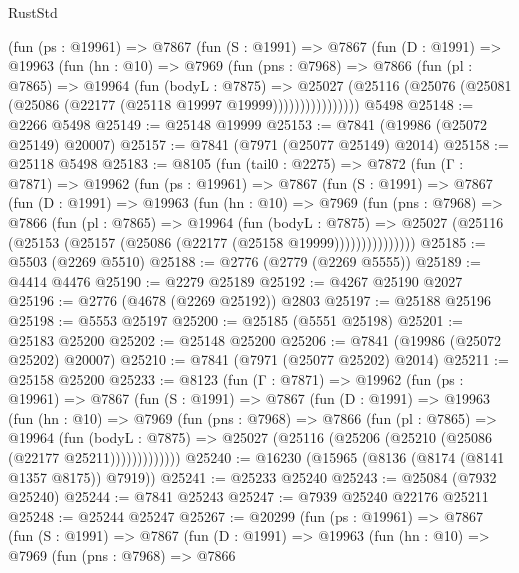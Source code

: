 \begin{lexlean}{RustStd}
\begin{coremodule}
          (fun (ps : @19961) =>
          @7867
            (fun (S : @1991) =>
            @7867
              (fun (D : @1991) =>
              @19963
                (fun (hn : @10) =>
                @7969
                  (fun (pns : @7968) =>
                  @7866
                    (fun (pl : @7865) =>
                    @19964
                      (fun (bodyL : @7875) =>
                      @25027
                        (@25116
                          (@25076 (@25081 (@25086 (@22177 (@25118 @19997 @19999))))))))))))))))
    @5498
@25148 := @2266 @5498
@25149 := @25148 @19999
@25153 := @7841 (@19986 (@25072 @25149) @20007)
@25157 := @7841 (@7971 (@25077 @25149) @2014)
@25158 := @25118 @5498
@25183 := @8105
    (fun (tail0 : @2275) =>
    @7872
      (fun (Γ : @7871) =>
      @19962
        (fun (ps : @19961) =>
        @7867
          (fun (S : @1991) =>
          @7867
            (fun (D : @1991) =>
            @19963
              (fun (hn : @10) =>
              @7969
                (fun (pns : @7968) =>
                @7866
                  (fun (pl : @7865) =>
                  @19964
                    (fun (bodyL : @7875) =>
                    @25027 (@25116 (@25153 (@25157 (@25086 (@22177 (@25158 @19999)))))))))))))))
@25185 := @5503 (@2269 @5510)
@25188 := @2776 (@2779 (@2269 @5555))
@25189 := @4414 @4476
@25190 := @2279 @25189
@25192 := @4267 @25190 @2027
@25196 := @2776 (@4678 (@2269 @25192)) @2803
@25197 := @25188 @25196
@25198 := @5553 @25197
@25200 := @25185 (@5551 @25198)
@25201 := @25183 @25200
@25202 := @25148 @25200
@25206 := @7841 (@19986 (@25072 @25202) @20007)
@25210 := @7841 (@7971 (@25077 @25202) @2014)
@25211 := @25158 @25200
@25233 := @8123
    (fun (Γ : @7871) =>
    @19962
      (fun (ps : @19961) =>
      @7867
        (fun (S : @1991) =>
        @7867
          (fun (D : @1991) =>
          @19963
            (fun (hn : @10) =>
            @7969
              (fun (pns : @7968) =>
              @7866
                (fun (pl : @7865) =>
                @19964
                  (fun (bodyL : @7875) =>
                  @25027 (@25116 (@25206 (@25210 (@25086 (@22177 @25211)))))))))))))
@25240 := @16230 (@15965 (@8136 (@8174 (@8141 @1357 @8175)) @7919))
@25241 := @25233 @25240
@25243 := @25084 (@7932 @25240)
@25244 := @7841 @25243
@25247 := @7939 @25240 @22176 @25211
@25248 := @25244 @25247
@25267 := @20299
    (fun (ps : @19961) =>
    @7867
      (fun (S : @1991) =>
      @7867
        (fun (D : @1991) =>
        @19963
          (fun (hn : @10) =>
          @7969
            (fun (pns : @7968) =>
            @7866

\end{coremodule}
\end{lexlean}
